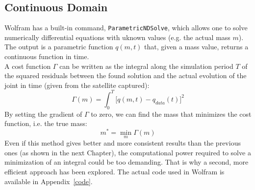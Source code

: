 \documentclass[a4paper,12pt,oneside]{report}
\begin{document}
\subsection{Continuous Domain}
Wolfram has a built-in command, \texttt{ParametricNDSolve}, which allows one to solve numerically differential equations with uknown values (e.g. the actual mass $m$).\\
The output is a parametric function $q(m,t)$ that, given a mass value, returns a continuous function in time.\\
A cost function $\Gamma$ can be written as the integral along the simulation period $T$ of the squared residuals between the found solution and the actual evolution of the joint in time (given from the satellite captured):
\begin{equation}
  \Gamma(m)=\int_{0}^{T}\Big[q(m,t)-q_{data}(t)\Big]^2
\end{equation}
By setting the gradient of $\Gamma$ to zero, we can find the mass that minimizes the cost function, i.e. the true mass:
\begin{equation}
  m^*=\min_{m}\Gamma(m)
\end{equation}
Even if this method gives better and more consistent results than the previous ones (as shown in the next Chapter), the computational power required to solve a minimization of an integral could be too demanding. That is why a second, more efficient approach has been explored.
The actual code used in Wolfram is available in Appendix~\ref{code}.
\newpage
\end{document}
